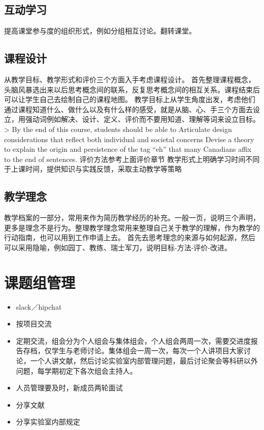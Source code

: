 \documentclass[]{tufte-book}
\providecommand{\tightlist}{%
  \setlength{\itemsep}{0pt}\setlength{\parskip}{0pt}}
\begin{document}
\hypertarget{ux4e92ux52a8ux5b66ux4e60}{%
\subsection{互动学习}\label{ux4e92ux52a8ux5b66ux4e60}}

提高课堂参与度的组织形式，例如分组相互讨论。翻转课堂。

\hypertarget{ux8bfeux7a0bux8bbeux8ba1}{%
\subsection{课程设计}\label{ux8bfeux7a0bux8bbeux8ba1}}

从教学目标、教学形式和评价三个方面入手考虑课程设计。
首先整理课程概念，头脑风暴选出来以后思考概念间的联系，反复思考概念间的相互关系。课程结束后可以让学生自己去绘制自己的课程地图。
教学目标上从学生角度出发，考虑他们通过课程知道什么、做什么以及有什么样的感受，就是从脑、心、手三个方面去设立，用强动词例如解决、设计、定义、评价而不要用知道、理解等词来设立目标。
\textgreater{} By the end of this course, students should be able to
Articulate design considerations that reflect both individual and societal concerns
Devise a theory to explain the origin and persistence of the tag ``eh'' that many Canadians affix to the end of sentences.
评价方法参考上面评价章节
教学形式上明确学习时间不同于上课时间，提供知识与实践反馈，采取主动教学等策略

\hypertarget{ux6559ux5b66ux7406ux5ff5}{%
\subsection{教学理念}\label{ux6559ux5b66ux7406ux5ff5}}

教学档案的一部分，常用来作为简历教学经历的补充。一般一页，说明三个声明，更多是理念不是行为。整理教学理念常用来整理自己关于教学的理解，作为教学的行动指南，也可以用到工作申请上去。
首先去思考理念的来源与如何起源，然后可以采用隐喻，例如园丁、教练、瑞士军刀，说明目标-方法-评价-改进。

\hypertarget{ux8bfeux9898ux7ec4ux7ba1ux7406}{%
\section{课题组管理}\label{ux8bfeux9898ux7ec4ux7ba1ux7406}}

\begin{itemize}
\tightlist
\item
  slack／hipchat
\item
  按项目交流
\item
  定期交流，组会分为个人组会与集体组会，个人组会两周一次，需要交进度报告存档，仅学生与老师讨论。集体组会一周一次，每次一个人讲项目大家讨论，一个人讲文献，然后讨论实验室内部管理问题，最后讨论聚会等科研以外问题，每学期初定下各次组会主持人。
\item
  人员管理要及时，新成员两轮面试
\item
  分享文献
\item
  分享实验室内部规定
\end{itemize}
\end{document}
